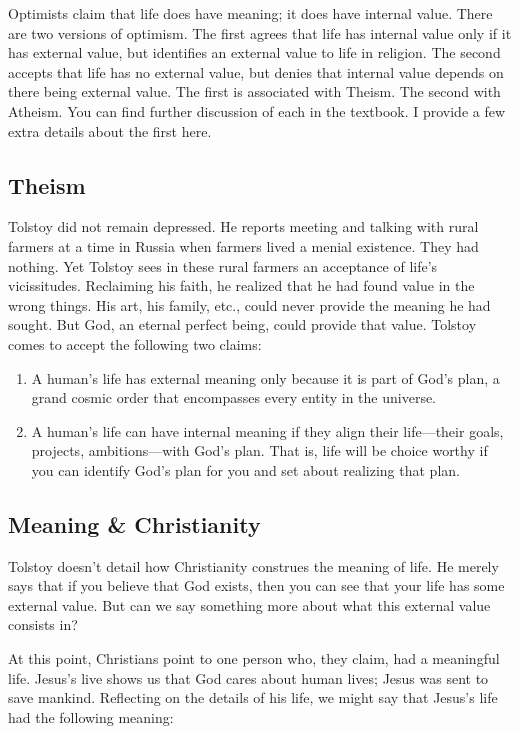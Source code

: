 \documentclass[]{article}
\begin{document}
Optimists claim that life does have meaning; it does have internal
value. There are two versions of optimism. The first agrees that life
has internal value only if it has external value, but identifies an
external value to life in religion. The second accepts that life has no
external value, but denies that internal value depends on there being
external value. The first is associated with Theism. The second with
Atheism. You can find further discussion of each in the textbook. I
provide a few extra details about the first here.

\subsection{Theism}\label{theism}

Tolstoy did not remain depressed. He reports meeting and talking with
rural farmers at a time in Russia when farmers lived a menial existence.
They had nothing. Yet Tolstoy sees in these rural farmers an acceptance
of life's vicissitudes. Reclaiming his faith, he realized that he had
found value in the wrong things. His art, his family, etc., could never
provide the meaning he had sought. But God, an eternal perfect being,
could provide that value. Tolstoy comes to accept the following two
claims:

\begin{enumerate}
\def\labelenumi{\arabic{enumi}.}
\item
  A human's life has external meaning only because it is part of God's
  plan, a grand cosmic order that encompasses every entity in the
  universe.
\item
  A human's life can have internal meaning if they align their
  life---their goals, projects, ambitions---with God's plan. That is,
  life will be choice worthy if you can identify God's plan for you and
  set about realizing that plan.
\end{enumerate}

\subsection{Meaning \& Christianity}\label{meaning-christianity}

Tolstoy doesn't detail how Christianity construes the meaning of life.
He merely says that if you believe that God exists, then you can see
that your life has some external value. But can we say something more
about what this external value consists in?

At this point, Christians point to one person who, they claim, had a
meaningful life. Jesus's live shows us that God cares about human lives;
Jesus was sent to save mankind. Reflecting on the details of his life,
we might say that Jesus's life had the following meaning:
\end{document}
